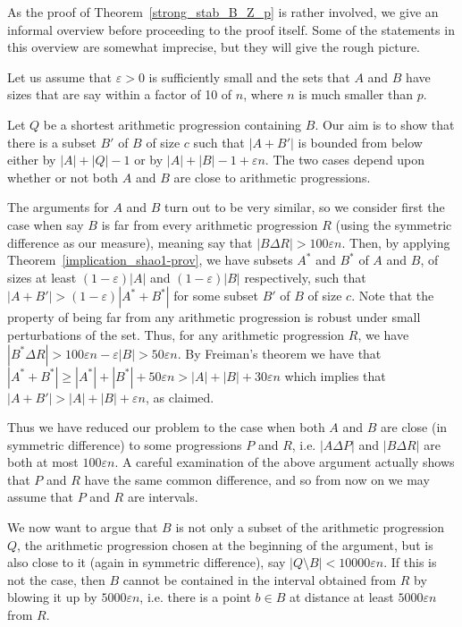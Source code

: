\documentclass[12pt,reqno]{amsart}
\theoremstyle{definition}
\renewcommand\geq{\geqslant}
\begin{document}
\vspace{10pt}
As the proof of Theorem~\ref{strong_stab_B_Z_p} is rather involved, we give an informal overview before
proceeding to the proof itself. Some of the statements in this overview are somewhat imprecise,
but they will give the rough picture.

Let us assume that $\varepsilon>0$ is sufficiently small and the sets
that $A$ and $B$ have sizes that are say within a factor of 10 of $n$, where $n$ is much smaller
than $p$.

Let $Q$ be a shortest arithmetic progression containing $B$. Our aim is to show that there is a subset $B'$ of
$B$ of size $c$ such that $|A+B'|$ is bounded from below either by $|A|+|Q|-1$ or
by $|A|+|B|-1+\varepsilon n$.
The two cases depend upon whether or not both $A$ and $B$ are close to arithmetic progressions.

The arguments for $A$ and $B$ turn out to be very similar, so we consider first the case when
say $B$ is
far from every arithmetic progression $R$ (using the symmetric difference as our measure),
meaning say that $|B \Delta R|> 100 \varepsilon n$. Then,
by applying Theorem~\ref{implication_shao1-prov},
we have subsets $A^*$ and $B^*$ of $A$ and $B$, of sizes at
least $(1 - \varepsilon)|A|$ and $(1 - \varepsilon)|B|$ respectively, such that
$|A+B'| > (1-\varepsilon) |A^*+B^*|$
for some subset $B'$ of $B$ of size $c$. Note that the property of being far
from any arithmetic progression is robust under small perturbations of the set.
Thus, for any arithmetic progression $R$, we have
$|B^* \Delta R|>100 \varepsilon n - \varepsilon |B| > 50 \varepsilon n$.
By Freiman's theorem we have that
$|A^*+B^*| \geq |A^*|+|B^*|+50 \varepsilon n > |A|+|B|+30 \varepsilon n$
which implies that   $|A+B'|> |A|+|B|+\varepsilon n$, as claimed.

Thus we have reduced our problem to the case when both $A$ and $B$ are close (in
symmetric difference) to some progressions $P$ and $R$, i.e.
$|A\Delta P|$ and $|B\Delta R|$ are both at most $100 \varepsilon n$.
A careful examination of the above argument actually shows
that $P$ and $R$ have the same common difference, and so from now on we
may assume that $P$ and $R$ are intervals.

We now want to argue that $B$ is not only a subset of the arithmetic progression $Q$,
the arithmetic progression chosen at the beginning  of the argument,
but is also close to it (again in symmetric difference), say $|Q \setminus
B| < 10000 \varepsilon n$. If this is not the case, then $B$ cannot be contained
in the interval obtained from $R$ by blowing it up by $5000 \varepsilon n$,
i.e. there is a point $b\in B$ at distance at least $5000 \varepsilon n$
from $R$.
\end{document}
